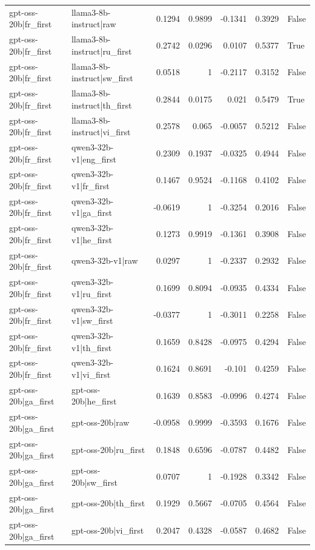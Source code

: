 \begin{table}
\begin{tabular}{l l r r r r l}
gpt-oss-20b|fr_first & llama3-8b-instruct|raw & 0.1294 & 0.9899 & -0.1341 & 0.3929 & False \\
gpt-oss-20b|fr_first & llama3-8b-instruct|ru_first & 0.2742 & 0.0296 & 0.0107 & 0.5377 & True \\
gpt-oss-20b|fr_first & llama3-8b-instruct|sw_first & 0.0518 & 1 & -0.2117 & 0.3152 & False \\
gpt-oss-20b|fr_first & llama3-8b-instruct|th_first & 0.2844 & 0.0175 & 0.021 & 0.5479 & True \\
gpt-oss-20b|fr_first & llama3-8b-instruct|vi_first & 0.2578 & 0.065 & -0.0057 & 0.5212 & False \\
gpt-oss-20b|fr_first & qwen3-32b-v1|eng_first & 0.2309 & 0.1937 & -0.0325 & 0.4944 & False \\
gpt-oss-20b|fr_first & qwen3-32b-v1|fr_first & 0.1467 & 0.9524 & -0.1168 & 0.4102 & False \\
gpt-oss-20b|fr_first & qwen3-32b-v1|ga_first & -0.0619 & 1 & -0.3254 & 0.2016 & False \\
gpt-oss-20b|fr_first & qwen3-32b-v1|he_first & 0.1273 & 0.9919 & -0.1361 & 0.3908 & False \\
gpt-oss-20b|fr_first & qwen3-32b-v1|raw & 0.0297 & 1 & -0.2337 & 0.2932 & False \\
gpt-oss-20b|fr_first & qwen3-32b-v1|ru_first & 0.1699 & 0.8094 & -0.0935 & 0.4334 & False \\
gpt-oss-20b|fr_first & qwen3-32b-v1|sw_first & -0.0377 & 1 & -0.3011 & 0.2258 & False \\
gpt-oss-20b|fr_first & qwen3-32b-v1|th_first & 0.1659 & 0.8428 & -0.0975 & 0.4294 & False \\
gpt-oss-20b|fr_first & qwen3-32b-v1|vi_first & 0.1624 & 0.8691 & -0.101 & 0.4259 & False \\
gpt-oss-20b|ga_first & gpt-oss-20b|he_first & 0.1639 & 0.8583 & -0.0996 & 0.4274 & False \\
gpt-oss-20b|ga_first & gpt-oss-20b|raw & -0.0958 & 0.9999 & -0.3593 & 0.1676 & False \\
gpt-oss-20b|ga_first & gpt-oss-20b|ru_first & 0.1848 & 0.6596 & -0.0787 & 0.4482 & False \\
gpt-oss-20b|ga_first & gpt-oss-20b|sw_first & 0.0707 & 1 & -0.1928 & 0.3342 & False \\
gpt-oss-20b|ga_first & gpt-oss-20b|th_first & 0.1929 & 0.5667 & -0.0705 & 0.4564 & False \\
gpt-oss-20b|ga_first & gpt-oss-20b|vi_first & 0.2047 & 0.4328 & -0.0587 & 0.4682 & False \\

\end{tabular}
\end{table}
